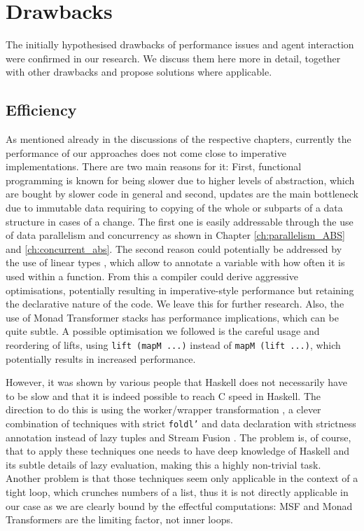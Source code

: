 \section{Drawbacks}
\label{sec:drawbacks}
The initially hypothesised drawbacks of performance issues and agent interaction were confirmed in our research. We discuss them here more in detail, together with other drawbacks and propose solutions where applicable.

\subsection{Efficiency}
\label{sec:drawback_efficiency}
As mentioned already in the discussions of the respective chapters, currently the performance of our approaches does not come close to imperative implementations. There are two main reasons for it: First, functional programming is known for being slower due to higher levels of abstraction, which are bought by slower code in general and second, updates are the main bottleneck due to immutable data requiring to copying of the whole or subparts of a data structure in cases of a change. The first one is easily addressable through the use of data parallelism and concurrency as shown in Chapter \ref{ch:parallelism_ABS} and \ref{ch:concurrent_abs}. The second reason could potentially be addressed by the use of linear types \cite{bernardy_linear_2017}, which allow to annotate a variable with how often it is used within a function. From this a compiler could derive aggressive optimisations, potentially resulting in imperative-style performance but retaining the declarative nature of the code. We leave this for further research. Also, the use of Monad Transformer stacks has performance implications, which can be quite subtle. A possible optimisation we followed is the careful usage and reordering of lifts, using \texttt{lift (mapM ...)} instead of \texttt{mapM (lift ...)}, which potentially results in increased performance.

However, it was shown by various people \cite{kqr_competing_2017, stewart_haskell_2008, stolarek_haskell_2013} that Haskell does not necessarily have to be slow and that it is indeed possible to reach C speed in Haskell. The direction to do this is using the worker/wrapper transformation \cite{gill_worker/wrapper_2009}, a clever combination of techniques with strict \texttt{foldl'} and data declaration with strictness annotation instead of lazy tuples and Stream Fusion \cite{coutts_stream_2007, mainland_haskell_2013}. The problem is, of course, that to apply these techniques one needs to have deep knowledge of Haskell and its subtle details of lazy evaluation, making this a highly non-trivial task. Another problem is that those techniques seem only applicable in the context of a tight loop, which crunches numbers of a list, thus it is not directly applicable in our case as we are clearly bound by the effectful computations: MSF and Monad Transformers are the limiting factor, not inner loops.

